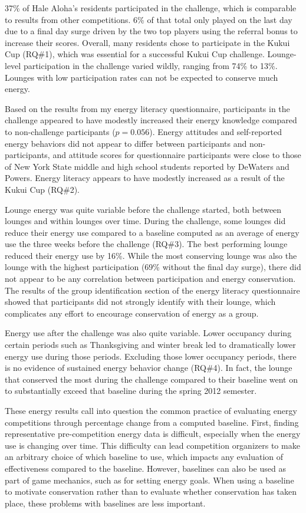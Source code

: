 37\% of Hale Aloha's residents participated in the challenge, which is comparable to results from other competitions. 6\% of that total only played on the last day due to a final day surge driven by the two top players using the referral bonus to increase their scores. Overall, many residents chose to participate in the Kukui Cup (RQ\#1), which was essential for a successful Kukui Cup challenge. Lounge-level participation in the challenge varied wildly, ranging from 74\% to 13\%. Lounges with low participation rates can not be expected to conserve much energy.

Based on the results from my energy literacy questionnaire, participants in the challenge appeared to have modestly increased their energy knowledge compared to non-challenge participants ($p = 0.056$). Energy attitudes and self-reported energy behaviors did not appear to differ between participants and non-participants, and attitude scores for questionnaire participants were close to those of New York State middle and high school students reported by DeWaters and Powers. Energy literacy appears to have modestly increased as a result of the Kukui Cup (RQ\#2).

Lounge energy was quite variable before the challenge started, both between lounges and within lounges over time. During the challenge, some lounges did reduce their energy use compared to a baseline computed as an average of energy use the three weeks before the challenge (RQ\#3). The best performing lounge reduced their energy use by 16\%. While the most conserving lounge was also the lounge with the highest participation (69\% without the final day surge), there did not appear to be any correlation between participation and energy conservation. The results of the group identification section of the energy literacy questionnaire showed that participants did not strongly identify with their lounge, which complicates any effort to encourage conservation of energy as a group.

Energy use after the challenge was also quite variable. Lower occupancy during certain periods such as Thanksgiving and winter break led to dramatically lower energy use during those periods. Excluding those lower occupancy periods, there is no evidence of sustained energy behavior change (RQ\#4). In fact, the lounge that conserved the most during the challenge compared to their baseline went on to substantially exceed that baseline during the spring 2012 semester.

These energy results call into question the common practice of evaluating energy competitions through percentage change from a computed baseline. First, finding representative pre-competition energy data is difficult, especially when the energy use is changing over time. This difficulty can lead competition organizers to make an arbitrary choice of which baseline to use, which impacts any evaluation of effectiveness compared to the baseline. However, baselines can also be used as part of game mechanics, such as for setting energy goals. When using a baseline to motivate conservation rather than to evaluate whether conservation has taken place, these problems with baselines are less important.

